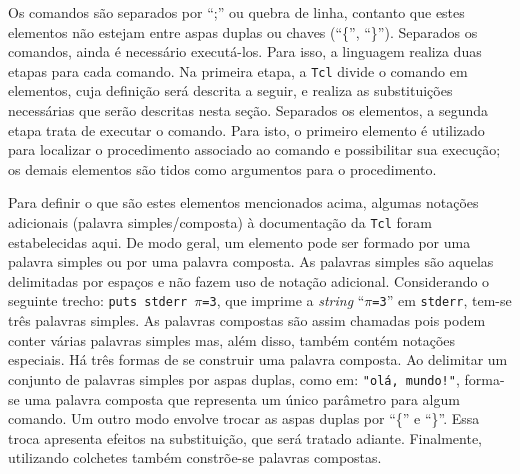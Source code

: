 
Os comandos são separados por ``;'' ou quebra de linha, contanto que
estes elementos não estejam entre aspas duplas ou chaves (``\{'',
``\}''). Separados os comandos, ainda é necessário executá-los. Para
isso, a linguagem realiza duas etapas para cada comando. Na primeira
etapa, a \texttt{Tcl} divide o comando em elementos, cuja definição será
descrita a seguir, e realiza as substituições necessárias que serão
descritas nesta seção. Separados os elementos, a segunda etapa trata de
executar o comando. Para isto, o primeiro elemento é utilizado
para localizar o procedimento associado ao comando e possibilitar sua
execução; os demais elementos são tidos como argumentos para o
procedimento.

Para definir o que são estes elementos mencionados acima, algumas
notações adicionais (palavra simples/composta) à documentação da \texttt{Tcl}
\cite{Tcl.n-manpage} foram estabelecidas aqui. De modo geral, um
elemento pode ser formado por uma palavra simples ou por uma palavra
composta. As palavras simples são
aquelas delimitadas por espaços e não fazem uso de notação adicional.
Considerando o seguinte trecho:
\texttt{puts stderr $\pi$=3},
 que imprime a \textit{string} ``\texttt{$\pi$=3}''
em \verb!stderr!, tem-se três palavras simples. As palavras compostas
são assim chamadas pois podem conter várias palavras simples mas, além
disso, também contém notações especiais. Há três formas de se
construir uma palavra composta. Ao delimitar um conjunto de
palavras simples por aspas duplas, como em: \verb|"olá, mundo!"|,
forma-se uma palavra composta que representa um único parâmetro para
algum comando. Um outro modo envolve trocar as aspas duplas por ``\{''
e ``\}''. Essa troca apresenta efeitos na substituição, que será
tratado adiante. Finalmente, utilizando colchetes também constrõe-se
palavras compostas.

